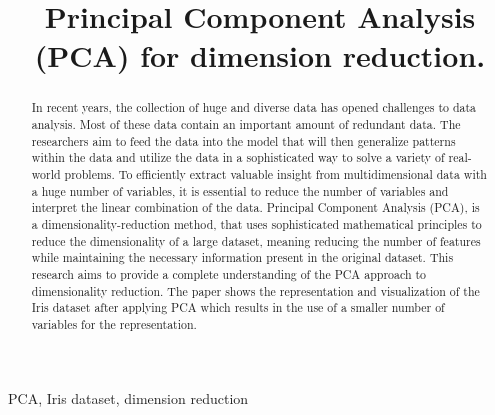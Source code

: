 \documentclass[conference]{IEEEtran}
\begin{document}
\title{Principal Component Analysis (PCA) for dimension reduction.\\

}

\author{
}

\maketitle

\begin{abstract}
In recent years, the collection of huge and diverse data has opened challenges to data analysis. Most of these data contain an important amount of redundant data. The researchers aim to feed the data into the model that will then generalize patterns within the data and utilize the data in a sophisticated way to solve a variety of real-world problems. To efficiently extract valuable insight from multidimensional data with a huge number of variables, it is essential to reduce the number of variables and interpret the linear combination of the data. Principal Component Analysis (PCA), is a dimensionality-reduction method, that uses sophisticated mathematical principles to reduce the dimensionality of a large dataset, meaning reducing the number of features while maintaining the necessary information present in the original dataset. This research aims to provide a complete understanding of the PCA approach to dimensionality reduction. The paper shows the representation and visualization of the Iris dataset after applying PCA which results in the use of a smaller number of variables for the representation.
\end{abstract}

\begin{IEEEkeywords}
PCA, Iris dataset, dimension reduction
\end{IEEEkeywords}
\end{document}
